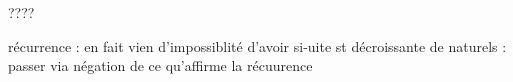 ????



  récurrence : en fait vien d'impossiblité d'avoir si-uite st décroissante de naturels : passer via négation de ce qu'affirme la récuurence

